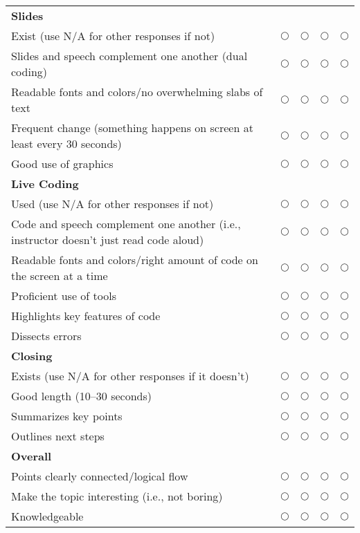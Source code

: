 {\begin{longtable}{p{}cccc}
  \textbf{Slides} & & & & \\
  Exist (use N/A for other responses if not) & $\bigcirc$ & $\bigcirc$ & $\bigcirc$ & $\bigcirc$ \\
  Slides and speech complement one another (dual coding) & $\bigcirc$ & $\bigcirc$ & $\bigcirc$ & $\bigcirc$ \\
  Readable fonts and colors/no overwhelming slabs of text & $\bigcirc$ & $\bigcirc$ & $\bigcirc$ & $\bigcirc$ \\
  Frequent change (something happens on screen at least every 30 seconds) & $\bigcirc$ & $\bigcirc$ & $\bigcirc$ & $\bigcirc$ \\
  Good use of graphics & $\bigcirc$ & $\bigcirc$ & $\bigcirc$ & $\bigcirc$ \\

  \textbf{Live Coding} & & & & \\
  Used (use N/A for other responses if not) & $\bigcirc$ & $\bigcirc$ & $\bigcirc$ & $\bigcirc$ \\
  Code and speech complement one another (i.e., instructor doesn't just read code aloud) & $\bigcirc$ & $\bigcirc$ & $\bigcirc$ & $\bigcirc$ \\
  Readable fonts and colors/right amount of code on the screen at a time & $\bigcirc$ & $\bigcirc$ & $\bigcirc$ & $\bigcirc$ \\
  Proficient use of tools & $\bigcirc$ & $\bigcirc$ & $\bigcirc$ & $\bigcirc$ \\
  Highlights key features of code & $\bigcirc$ & $\bigcirc$ & $\bigcirc$ & $\bigcirc$ \\
  Dissects errors & $\bigcirc$ & $\bigcirc$ & $\bigcirc$ & $\bigcirc$ \\

  \textbf{Closing} & & & & \\
  Exists (use N/A for other responses if it doesn't) & $\bigcirc$ & $\bigcirc$ & $\bigcirc$ & $\bigcirc$ \\
  Good length (10--30 seconds) & $\bigcirc$ & $\bigcirc$ & $\bigcirc$ & $\bigcirc$ \\
  Summarizes key points & $\bigcirc$ & $\bigcirc$ & $\bigcirc$ & $\bigcirc$ \\
  Outlines next steps & $\bigcirc$ & $\bigcirc$ & $\bigcirc$ & $\bigcirc$ \\

  \textbf{Overall} & & & & \\
  Points clearly connected/logical flow & $\bigcirc$ & $\bigcirc$ & $\bigcirc$ & $\bigcirc$ \\
  Make the topic interesting (i.e., not boring) & $\bigcirc$ & $\bigcirc$ & $\bigcirc$ & $\bigcirc$ \\
  Knowledgeable & $\bigcirc$ & $\bigcirc$ & $\bigcirc$ & $\bigcirc$ \\

\end{longtable}
}
